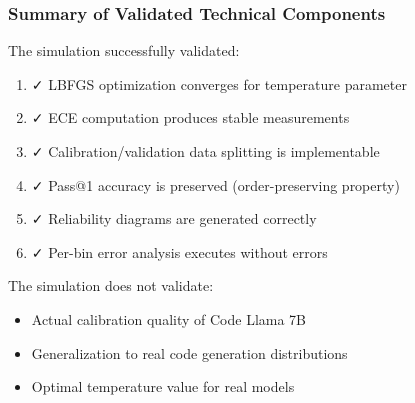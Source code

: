 \subsubsection{Summary of Validated Technical Components}

The simulation successfully validated:
\begin{enumerate}
\item ✓ LBFGS optimization converges for temperature parameter
\item ✓ ECE computation produces stable measurements
\item ✓ Calibration/validation data splitting is implementable
\item ✓ Pass@1 accuracy is preserved (order-preserving property)
\item ✓ Reliability diagrams are generated correctly
\item ✓ Per-bin error analysis executes without errors
\end{enumerate}

The simulation does not validate:
\begin{itemize}
\item Actual calibration quality of Code Llama 7B
\item Generalization to real code generation distributions
\item Optimal temperature value for real models
\end{itemize}

